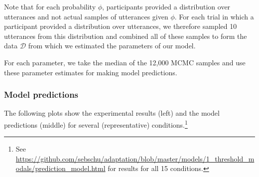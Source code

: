 \documentclass[lucida,biblatex]{sp} %
\begin{document}
Note that for each probability $\phi$, participants provided a distribution over utterances and not actual samples of utterances given $\phi$. For each trial in which a participant provided a distribution over utterances, we therefore sampled 10 utterances from this distribution and combined all of these samples to form the data $\mathscr{D}$ from which we estimated the parameters of our model.

For each parameter, we take the median of the 12,000 MCMC samples and use these parameter estimates for making model predictions.


\subsubsection{Model predictions}

The following plots show the experimental results (left) and the model predictions (middle) for several (representative) conditions.\footnote{See \url{https://github.com/sebschu/adaptation/blob/master/models/1_threshold_modals/prediction_model.html} for results for all 15 conditions.}
\end{document}
